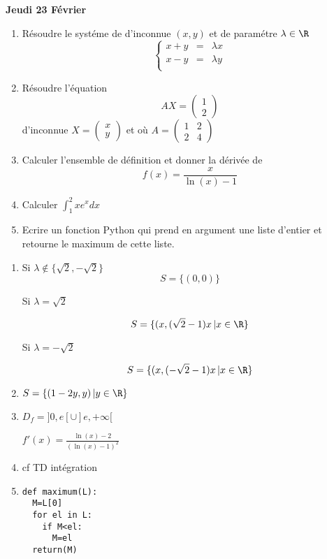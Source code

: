 \documentclass[a4paper, 11pt,reqno]{article}
\begin{document}
\begin{center}
\textbf{Jeudi 23 Février }
\end{center}
\begin{enumerate}
\item Résoudre le systéme de d'inconnue $(x,y)$ et de paramétre $\lambda \in \R$
$$\left\{ \begin{array}{ccc}
x+y&=& \lambda x\\
x-y&=& \lambda y\\
\end{array}\right.$$

\item Résoudre l'équation
$$
AX=\begin{pmatrix}
1\\
2
\end{pmatrix}$$
 d'inconnue $X=\begin{pmatrix}
x\\y
\end{pmatrix}$  et où $A=\begin{pmatrix}
1 & 2\\
2 & 4
\end{pmatrix}$
\item Calculer l'ensemble de définition et donner la dérivée de $$f(x) =\frac{x}{\ln(x)-1}$$
\item Calculer $\int_1^2 xe^xdx$
\item Ecrire un fonction Python qui prend en argument une liste d'entier et retourne le maximum de cette liste. 
\end{enumerate}

\begin{correction}
\begin{enumerate}
\item  Si $\lambda \notin \{ \sqrt{2}, -\sqrt{2}\}$
$$S=\{ (0,0)\}$$

Si $\lambda =\sqrt{2}$

$$S=\{ (x,(\sqrt{2}-1)x\, | x\in \R\}$$


Si $\lambda =-\sqrt{2}$

$$S=\{ (x,(-\sqrt{2}-1)x\, | x\in \R\}$$
\item $S=\{ (1-2y, y) \, | y \in \R\}$
\item $D_f =]0,e[\cup ]e, +\infty[$

$f'(x) = \frac{\ln(x)-2 }{(\ln(x)-1)^2}$ 
\item cf TD intégration
\item 
\begin{lstlisting}
def maximum(L):
  M=L[0]
  for el in L:
    if M<el:
      M=el
  return(M)
\end{lstlisting}
\end{enumerate}
\end{correction}
 
\end{document}
